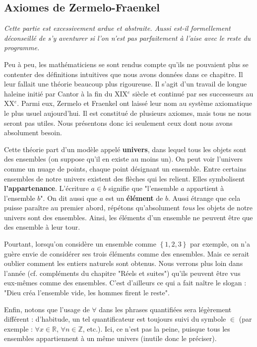 \documentclass[french]{book}
\newcommand{\Z}{\mathbb{Z}}
\newcommand{\R}{\mathbb{R}}
\theoremstyle{plain}
\theoremstyle{definition}
\theoremstyle{remark}
\begin{document}
\subsection{Axiomes de Zermelo-Fraenkel}
\textit{Cette partie est excessivement ardue et abstraite. Aussi est-il formellement déconseillé de s'y aventurer si l'on n'est pas parfaitement à l'aise avec le reste du programme.} \\ \par Peu à peu, les mathématiciens se sont rendus compte qu'ils ne pouvaient plus se contenter des définitions intuitives que nous avons données dans ce chapitre. Il leur fallait une théorie beaucoup plus rigoureuse. Il s'agit d'un travail de longue haleine initié par Cantor à la fin du XIX$^e$ siècle et continué par ses successeurs au XX$^e$. Parmi eux, Zermelo et Fraenkel ont laissé leur nom au système axiomatique le plus usuel aujourd'hui. Il est constitué de plusieurs axiomes, mais tous ne nous seront pas utiles. Nous présentons donc ici seulement ceux dont nous avons absolument besoin.\\ \par Cette théorie part d'un modèle appelé \textbf{univers}, dans lequel tous les objets sont des ensembles (on suppose qu'il en existe au moins un). On peut voir l'univers comme un nuage de points, chaque point désignant un ensemble. Entre certains ensembles de notre univers existent des flèches qui les relient. Elles symbolisent \textbf{l'appartenance}. L'écriture $a\in b$ signifie que "l'ensemble $a$ appartient à l'ensemble $b$". On dit aussi que $a$ est un \textbf{élément} de $b$. Aussi étrange que cela puisse paraître au premier abord, répétons qu'absolument \textit{tous} les objets de notre univers sont des ensembles. Ainsi, les éléments d'un ensemble ne peuvent être que des ensemble à leur tour.\\ \par Pourtant, lorsqu'on considère un ensemble comme $\left\{1,2,3\right\}$ par exemple, on n'a guère envie de considérer ses trois éléments comme des ensembles. Mais ce serait oublier comment les entiers naturels sont obtenus. Nous verrons plus loin dans l'année (cf. compléments du chapitre "Réels et suites") qu'ils peuvent être vus eux-mêmes comme des ensembles. C'est d'ailleurs ce qui a fait naître le slogan : "Dieu créa l'ensemble vide, les hommes firent le reste".\\ \par Enfin, notons que l'usage de $\forall$ dans les phrases quantifiées sera légèrement différent : d'habitude, un tel quantificateur est toujours suivi du symbole $\in$ (par exemple : $\forall x\in\R$, $\forall n\in\Z$, etc.). Ici, ce n'est pas la peine, puisque tous les ensembles appartiennent à un même univers (inutile donc le préciser).
\end{document}
